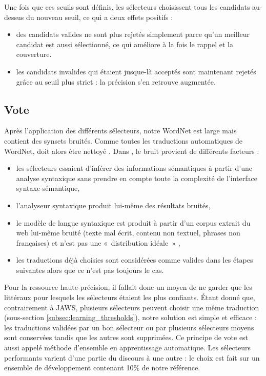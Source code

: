 Une fois que ces seuils sont définis, les sélecteurs choisissent tous les candidats au-dessus du nouveau seuil, ce qui a deux effets positifs :

\begin{itemize}
    \item des candidats valides ne sont plus rejetés simplement parce qu'un meilleur candidat est aussi sélectionné, ce qui améliore à la fois le rappel et la couverture.
    \item les candidats invalides qui étaient jusque-là acceptés sont maintenant rejetés grâce au seuil plus strict : la précision s'en retrouve augmentée.
\end{itemize}

\subsection{Vote}
\label{subsec:voting}

Après l'application des différents sélecteurs, notre WordNet est large mais contient des synsets bruités. Comme toutes les traductions automatiques de WordNet, \newjaws{} doit alors être nettoyé \citep{sagot2012cleaning}. Dans \newjaws{}, le bruit provient de différents facteurs :

\begin{itemize}
    \item les sélecteurs essaient d'inférer des informations sémantiques à partir d'une analyse syntaxique sans prendre en compte toute la complexité de l'interface syntaxe-sémantique,
    \item l'analyseur syntaxique produit lui-même des résultats bruités,
    \item le modèle de langue syntaxique est produit à partir d'un corpus extrait du web lui-même bruité (texte mal écrit, contenu non textuel, phrases non françaises) et n'est pas une «~distribution idéale~» \citep{copestake2012lexicalised},
    \item les traductions déjà choisies sont considérées comme valides dans les étapes suivantes alors que ce n'est pas toujours le cas.
\end{itemize}

Pour la ressource haute-précision, il fallait donc un moyen de ne garder que les littéraux pour lesquels les sélecteurs étaient les plus confiants. Étant donné que, contrairement à JAWS, plusieurs sélecteurs peuvent choisir une même traduction (sous-section \ref{subsec:learning_thresholds}), notre solution est simple et efficace : les traductions validées par un bon sélecteur ou par plusieurs sélecteurs moyens sont conservées tandis que les autres sont supprimées. Ce principe de vote est aussi appelé méthode d'ensemble en apprentissage automatique. Les sélecteurs performants varient d'une partie du discours à une autre : le choix est fait sur un ensemble de développement contenant 10\% de notre référence.

